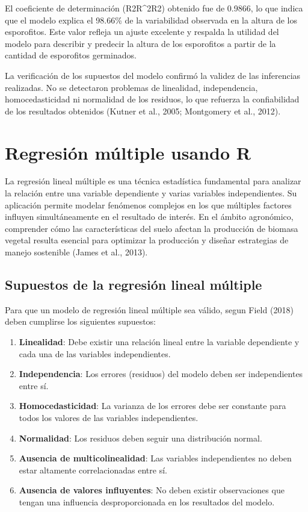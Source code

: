 \documentclass[
  spanish,
  a4paper,
  DIV=11,
  numbers=noendperiod,
  onepage,
  openany]{scrreprt}
\begin{document}
El coeficiente de determinación (R2R\^{}2R2) obtenido fue de 0.9866, lo
que indica que el modelo explica el 98.66\% de la variabilidad observada
en la altura de los esporofitos. Este valor refleja un ajuste excelente
y respalda la utilidad del modelo para describir y predecir la altura de
los esporofitos a partir de la cantidad de esporofitos germinados.

La verificación de los supuestos del modelo confirmó la validez de las
inferencias realizadas. No se detectaron problemas de linealidad,
independencia, homocedasticidad ni normalidad de los residuos, lo que
refuerza la confiabilidad de los resultados obtenidos (Kutner et al.,
2005; Montgomery et al., 2012).


\chapter{Regresión múltiple usando
R}\label{regresiuxf3n-muxfaltiple-usando-r}

La regresión lineal múltiple es una técnica estadística fundamental para
analizar la relación entre una variable dependiente y varias variables
independientes. Su aplicación permite modelar fenómenos complejos en los
que múltiples factores influyen simultáneamente en el resultado de
interés. En el ámbito agronómico, comprender cómo las características
del suelo afectan la producción de biomasa vegetal resulta esencial para
optimizar la producción y diseñar estrategias de manejo sostenible
(James et al., 2013).

\section{Supuestos de la regresión lineal
múltiple}\label{supuestos-de-la-regresiuxf3n-lineal-muxfaltiple}

Para que un modelo de regresión lineal múltiple sea válido, segun Field
(2018) deben cumplirse los siguientes supuestos:

\begin{enumerate}
\def\labelenumi{\arabic{enumi}.}
\item
  \textbf{Linealidad}: Debe existir una relación lineal entre la
  variable dependiente y cada una de las variables independientes.
\item
  \textbf{Independencia}: Los errores (residuos) del modelo deben ser
  independientes entre sí.
\item
  \textbf{Homocedasticidad}: La varianza de los errores debe ser
  constante para todos los valores de las variables independientes.
\item
  \textbf{Normalidad}: Los residuos deben seguir una distribución
  normal.
\item
  \textbf{Ausencia de multicolinealidad}: Las variables independientes
  no deben estar altamente correlacionadas entre sí.
\item
  \textbf{Ausencia de valores influyentes}: No deben existir
  observaciones que tengan una influencia desproporcionada en los
  resultados del modelo.
\end{enumerate}
\end{document}
